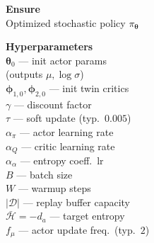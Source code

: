 \documentclass[11pt]{article}
\begin{document}
\begin{algorithm}[p]\small
\caption{SAC --- Soft Actor-Critic with Automatic Entropy Tuning}\label{alg:sac-scalar}
\vspace{2pt}
\noindent
\begin{minipage}[t]{0.28\linewidth}
\renewcommand{\arraystretch}{1.12}
\textbf{Ensure} \\[2pt]
Optimized stochastic policy $\pi_{\boldsymbol{\theta}}$

\vspace{6pt}
\textbf{Hyperparameters} \\[2pt]
$\boldsymbol{\theta}_0$ --- init actor params \\
\hspace*{1em}(outputs $\mu, \log\sigma$) \\
$\boldsymbol{\phi}_{1,0}, \boldsymbol{\phi}_{2,0}$ --- init twin critics \\
$\gamma$ --- discount factor \\
$\tau$ --- soft update (typ.\ $0.005$) \\
$\alpha_\pi$ --- actor learning rate \\
$\alpha_Q$ --- critic learning rate \\
$\alpha_\alpha$ --- entropy coeff.\ lr \\
$B$ --- batch size \\
$W$ --- warmup steps \\
$|\mathcal{D}|$ --- replay buffer capacity \\
$\bar{\mathcal{H}} = -d_a$ --- target entropy \\
$f_\mu$ --- actor update freq.\ (typ.\ $2$)


\end{minipage}
\end{algorithm}
\end{document}
